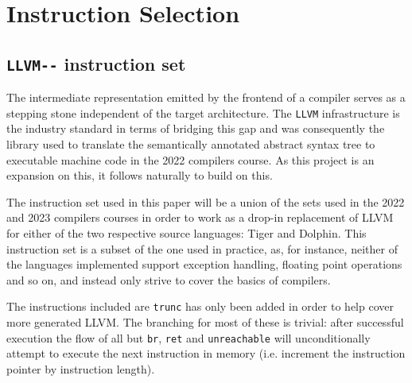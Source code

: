 \documentclass{article}
\begin{document}
\section{Instruction Selection}



\subsection{\lstinline!LLVM--! instruction set}

The intermediate representation emitted by the frontend of a compiler serves as a stepping stone independent of the target architecture. The \lstinline!LLVM! infrastructure is the industry standard in terms of bridging this gap and was consequently the library used to translate the semantically annotated abstract syntax tree to executable machine code in the 2022 compilers course. As this project is an expansion on this, it follows naturally to build on this. 

The instruction set used in this paper will be a union of the sets used in the 2022 and 2023 compilers courses in order to work as a drop-in replacement of LLVM for either of the two respective source languages:  Tiger and Dolphin. This instruction set is a subset of the one used in practice, as, for instance, neither of the languages implemented support exception handling, floating point operations and so on, and instead only strive to cover the basics of compilers.

The instructions included are
\lstinline!trunc! has only been added in order to help cover more generated LLVM.
The branching for most of these is trivial: after successful execution the flow of all but \lstinline!br!, \lstinline!ret! and \lstinline!unreachable! will unconditionally attempt to execute the next instruction in memory (i.e. increment the instruction pointer by instruction length).
\end{document}
